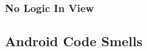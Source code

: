 \subsubsection{No Logic In View}






\subsection{Android Code Smells}
\label{sub:Android-code-smells}

